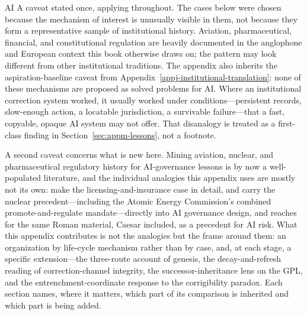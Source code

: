 \begin{refsection}
\begin{authbar}{AI}
A caveat stated once, applying throughout.
The cases below were chosen because the mechanism of interest is unusually visible in them, not because they form a representative sample of institutional history.
Aviation, pharmaceutical, financial, and constitutional regulation are heavily documented in the anglophone and European context this book otherwise draws on; the pattern may look different from other institutional traditions.
The appendix also inherits the aspiration-baseline caveat from Appendix~\ref{appj-institutional-translation}: none of these mechanisms are proposed as solved problems for AI.
Where an institutional correction system worked, it usually worked under conditions---persistent records, slow-enough action, a locatable jurisdiction, a survivable failure---that a fast, copyable, opaque AI system may not offer.
That disanalogy is treated as a first-class finding in Section~\ref{sec:appm-lessons}, not a footnote.

A second caveat concerns what is new here.
Mining aviation, nuclear, and pharmaceutical regulatory history for AI-governance lessons is by now a well-populated literature, and the individual analogies this appendix uses are mostly not its own: \textcite{anderljung2023frontier} make the licensing-and-insurance case in detail, \textcite{zaidi2021baruch} and \textcite{law2023dualmandate} carry the nuclear precedent---including the Atomic Energy Commission's combined promote-and-regulate mandate---directly into AI governance design, and \textcite{miller2025precedents} reaches for the same Roman material, Caesar included, as a precedent for AI risk.
What this appendix contributes is not the analogies but the frame around them: an organization by life-cycle mechanism rather than by case, and, at each stage, a specific extension---the three-route account of genesis, the decay-and-refresh reading of correction-channel integrity, the successor-inheritance lens on the GPL, and the entrenchment-coordinate response to the corrigibility paradox.
Each section names, where it matters, which part of its comparison is inherited and which part is being added.

\end{authbar}
\authbarneedspace

\end{refsection}
